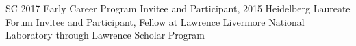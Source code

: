 SC 2017 Early Career Program Invitee and Participant, 2015 Heidelberg Laureate Forum Invitee and Participant, Fellow at Lawrence Livermore National Laboratory through Lawrence Scholar Program


